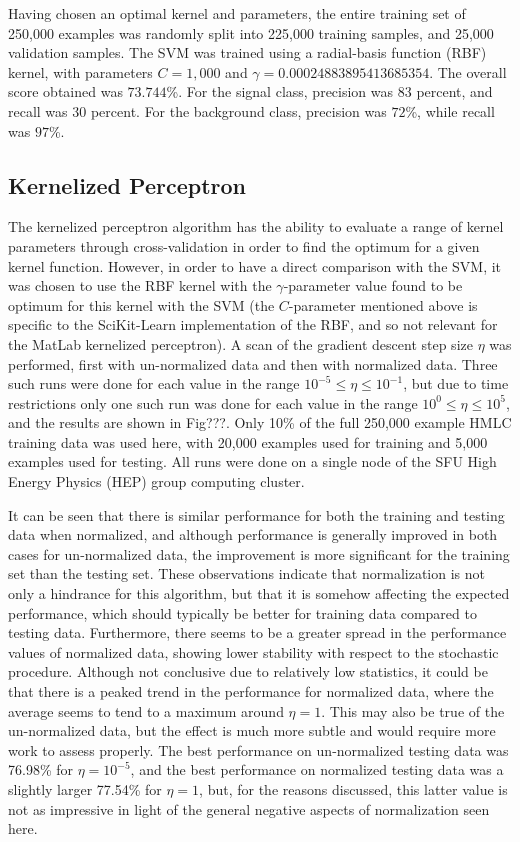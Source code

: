 \documentclass{article} %
\begin{document}
Having chosen an optimal kernel and parameters, the entire training set of 250,000 examples was randomly split into 225,000 training samples, and 25,000 validation samples. The SVM was trained using a radial-basis function (RBF) kernel, with parameters $C=1,000$ and $\gamma=0.00024883895413685354$. The overall score obtained was $73.744$\%. For the signal class, precision was $83$ percent, and recall was $30$ percent. For the background class, precision was $72$\%, while recall was $97$\%.

\subsection{Kernelized Perceptron}
The kernelized perceptron algorithm has the ability to evaluate a range of kernel parameters through cross-validation in order to find the optimum for a given kernel function. However, in order to have a direct comparison with the SVM, it was chosen to use the RBF kernel with the $\gamma$-parameter value found to be optimum for this kernel with the SVM (the $C$-parameter mentioned above is specific to the SciKit-Learn implementation of the RBF, and so not relevant for the MatLab kernelized perceptron). A scan of the gradient descent step size $\eta$ was performed, first with un-normalized data and then with normalized data. Three such runs were done for each value in the range $10^{-5}\le\eta\le10^{-1}$, but due to time restrictions only one such run was done for each value in the range $10^{0}\le\eta\le10^{5}$, and the results are shown in Fig{???}. Only 10\% of the full 250,000 example HMLC training data was used here, with 20,000 examples used for training and 5,000 examples used for testing. All runs were done on a single node of the SFU High Energy Physics (HEP) group computing cluster.

It can be seen that there is similar performance for both the training and testing data when normalized, and although performance is generally improved in both cases for un-normalized data, the improvement is more significant for the training set than the testing set. These observations indicate that normalization is not only a hindrance for this algorithm, but that it is somehow affecting the expected performance, which should typically be better for training data compared to testing data. Furthermore, there seems to be a greater spread in the performance values of normalized data, showing lower stability with respect to the stochastic procedure. Although not conclusive due to relatively low statistics, it could be that there is a peaked trend in the performance for normalized data, where the average seems to tend to a maximum around $\eta=1$. This may also be true of the un-normalized data, but the effect is much more subtle and would require more work to assess properly. The best performance on un-normalized testing data was 76.98\% for $\eta=10^{-5}$, and the best performance on normalized testing data was a slightly larger 77.54\% for $\eta=1$, but, for the reasons discussed, this latter value is not as impressive in light of the general negative aspects of normalization seen here.
\end{document}
